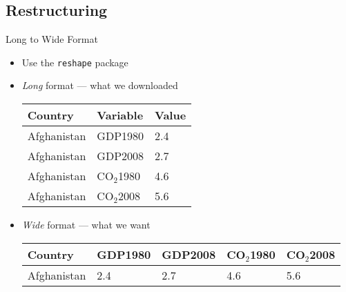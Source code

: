 \documentclass{beamer}
\begin{document}
\subsection{Restructuring}
\begin{frame}{Long to Wide Format}
\begin{itemize}
	\item Use the {\tt reshape} package
	\item \emph{Long} format --- what we downloaded \\
		\begin{table}
			\begin{tabular}{ | l | l | l | } \hline
			Country		& Variable		& Value \\ \hline
			Afghanistan	& GDP1980		& 2.4   \\ \hline
			Afghanistan	& GDP2008  		& 2.7   \\ \hline
			Afghanistan	& CO$_2$1980  	& 4.6   \\ \hline
			Afghanistan	& CO$_2$2008  	& 5.6   \\ \hline
			\end{tabular}
		\end{table}
		
	\item \emph{Wide} format --- what we want \\
		\begin{table}
			\begin{tabular}{| l || l | l | l | l |} \hline
			Country		& GDP1980	& GDP2008	& CO$_2$1980	& CO$_2$2008 \\ \hline
			Afghanistan	& 2.4			& 2.7			& 4.6				& 5.6 \\ \hline
			\end{tabular}
		\end{table}
\end{itemize}
\end{frame}
\end{document}
